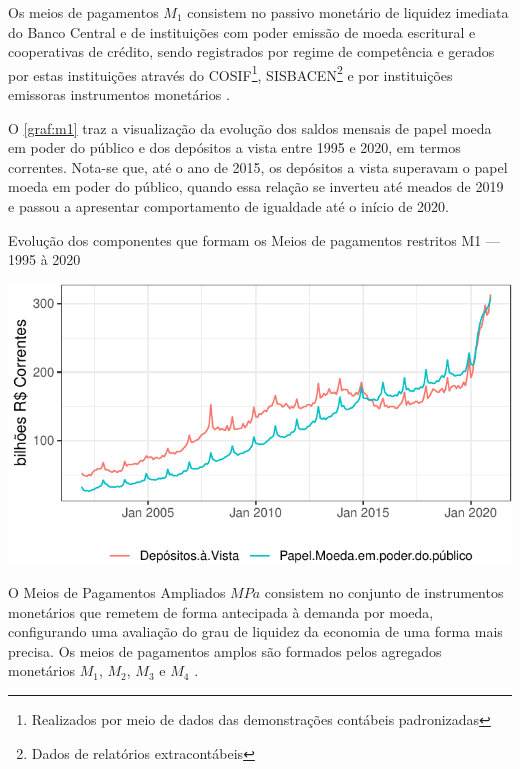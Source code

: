 \documentclass[
  12pt,
  12pt,
  openright,
  oneside,
  a4paper,
  chapter=TITLE,
  section=TITLE,
  subsection=TITLE,
  subsubsection=TITLE,
  english,
  portugues,
  sumario=tradicional]{abntex2}
\begin{document}
Os meios de pagamentos \(M_1\) consistem no passivo monetário de liquidez imediata do Banco Central e de instituições com poder emissão de moeda escritural e cooperativas de crédito, sendo registrados por regime de competência e gerados por estas instituições através do COSIF\footnote{ Realizados por meio de dados das demonstrações contábeis padronizadas}, SISBACEN\footnote{Dados de relatórios extracontábeis} e por instituições emissoras instrumentos monetários \cite{sgs:m1, sgs:mpa}.

O \autoref{graf:m1} traz a visualização da evolução dos saldos mensais de papel moeda em poder do público e dos depósitos a vista entre 1995 e 2020, em termos correntes. Nota-se que, até o ano de 2015, os depósitos a vista superavam o papel moeda em poder do público, quando essa relação se inverteu até meados de 2019 e passou a apresentar comportamento de igualdade até o início de 2020.

\begin{grafico}[!hbtp]
\vspace{20pt}
\caption{Evolução dos componentes que formam os Meios de pagamentos restritos M1 — 1995 à 2020}
\vspace{-4mm}

\begin{center}\includegraphics{12-exportedfigures/m1-1} \end{center}
\vspace{-3mm}
\label{graf:m1}
\vspace{-2mm}
\end{grafico}

O Meios de Pagamentos Ampliados \(MPa\) consistem no conjunto de instrumentos monetários que remetem de forma antecipada à demanda por moeda, configurando uma avaliação do grau de liquidez da economia de uma forma mais precisa. Os meios de pagamentos amplos são formados pelos agregados monetários \(M_1\), \(M_2\), \(M_3\) e \(M_4\) \cite{sgs:mpa}.
\end{document}
